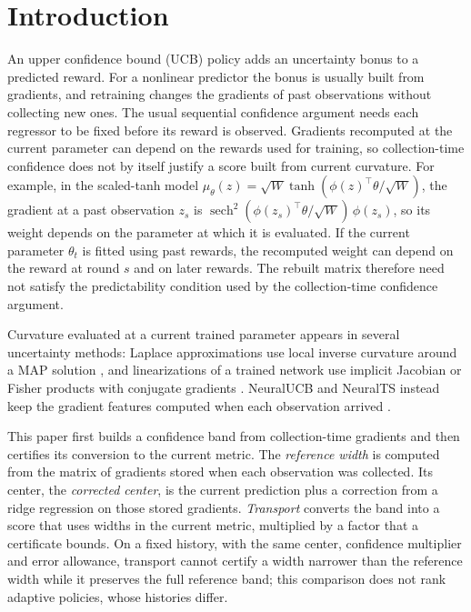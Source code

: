 \section{Introduction}\label{sec:intro}

An upper confidence bound (UCB) policy adds an uncertainty bonus to a predicted
reward. For a nonlinear predictor the bonus is usually built from gradients,
and retraining changes the gradients of past observations without collecting
new ones. The usual sequential confidence argument needs each regressor to be
fixed before its reward is observed. Gradients recomputed at the current
parameter can depend on the rewards used for training, so collection-time
confidence does not by itself justify a score built from current curvature.
For example, in the scaled-tanh model
$\mu_\theta(z)=\sqrt W\tanh(\phi(z)^\top\theta/\sqrt W)$, the gradient at a
past observation $z_s$ is
$\operatorname{sech}^2(\phi(z_s)^\top\theta/\sqrt W)\,\phi(z_s)$, so its
weight depends on the parameter at which it is evaluated. If the current
parameter $\theta_t$ is fitted using past rewards, the recomputed weight can
depend on the reward at round $s$ and on later rewards. The rebuilt matrix
therefore need not satisfy the predictability condition used by the
collection-time confidence argument.

Curvature evaluated at a current trained parameter appears in several
uncertainty methods: Laplace approximations use local inverse curvature
around a MAP solution
\citep{mackay1992practical,kristiadi2020being,daxberger2021laplace}, and
linearizations of a trained network use implicit Jacobian or Fisher products
with conjugate gradients \citep{maddox2021fast}. NeuralUCB and NeuralTS
instead keep the gradient features computed when each observation arrived
\citep{zhou2020neural,zhang2021neural}.

This paper first builds a confidence band from collection-time gradients and
then certifies its conversion to the current metric. The \emph{reference width} is computed from the matrix of gradients stored when
each observation was collected. Its center, the \emph{corrected center}, is
the current prediction plus a correction from a ridge regression on those
stored gradients. \emph{Transport} converts the band into a score that uses
widths in the current metric, multiplied by a factor that a certificate
bounds. On a fixed history, with the same center, confidence multiplier and
error allowance, transport cannot certify a width narrower than the reference
width while it preserves the full reference band; this comparison does not
rank adaptive policies, whose histories differ.

